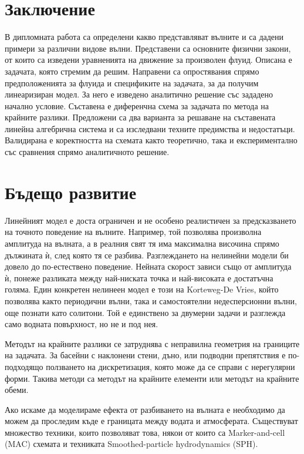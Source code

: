 \documentclass[12pt]{article}
\numberwithin{equation}{section}
\begin{document}
\clearpage
\section{Заключение}
В дипломната работа са определени какво представляват вълните и са дадени примери за различни видове вълни. Представени са основните физични закони, от които са изведени уравненията на движение за произволен флуид. Описана е задачата, която стремим да решим. Направени са опростявания спрямо предположенията за флуида и спецификите на задачата, за да получим линеаризиран модел. За него е изведено аналитично решение със зададено начално условие. Съставена е диференчна схема за задачата по метода на крайните разлики. Предложени са два варианта за решаване на съставената линейна алгебрична система и са изследвани техните предимства и недостатъци. Валидирана е коректността на схемата както теоретично, така и експериментално със сравнения спрямо аналитичното решение.

\section{Бъдещо развитие}
Линейният модел е доста ограничен и не особено реалистичен за предсказването на точното поведение на вълните. Например, той позволява произволна амплитуда на вълната, а в реалния свят тя има максимална височина спрямо дължината ѝ, след която тя се разбива. Разглеждането на нелинейни модели би довело до по-естествено поведение. Нейната скорост зависи също от амплитуда ѝ, понеже разликата между най-ниската точка и най-високата е достатъчна голяма. Един конкретен нелинеен модел е този на Korteweg-De Vries, който позволява както периодични вълни, така и самостоятелни недесперсионни вълни, още познати като солитони. Той е единствено за двумерни задачи и разглежда само водната повърхност, но не и под нея.

Методът на крайните разлики се затруднява с неправилна геометрия на границите на задачата. За басейни с наклонени стени, дъно, или подводни препятствия е по-подходящо ползването на дискретизация, която може да се справи с нерегулярни форми. Такива методи са методът на крайните елементи или методът на крайните обеми.

Ако искаме да моделираме ефекта от разбиването на вълната е необходимо да можем да проследим къде е границата между водата и атмосферата. Съществуват множество техники, които позволяват това, някои от които са Marker-and-cell (MAC) схемата и техниката Smoothed-particle hydrodynamics (SPH).
\end{document}
